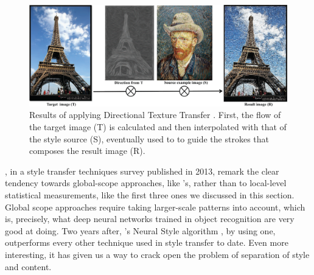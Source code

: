 \begin{figure}[htbp]
  \includegraphics[width=\textwidth]{gfx/style-transfer-directional}
  \caption{
    Results of applying Directional Texture Transfer \cite{Lee2010}.
    First, the flow of the target image (T) is calculated and then interpolated with that of the style source (S), eventually used to to guide the strokes that composes the result image (R).
  }
  \label{fig:sec:context:style-transfer:style-transfer-directional}
\end{figure}

\citeauthor{Kyprianidis2013}, in a style transfer techniques survey \cite{Kyprianidis2013} published in 2013, remark the clear tendency towards global-scope approaches, like \citeauthor{Lee2010}'s, rather than to local-level statistical measurements, like the first three ones we discussed in this section.
Global scope approaches require taking larger-scale patterns into account, which is, precisely, what deep neural networks trained in object recognition are very good at doing.
Two years after, \citeauthor{Gatys2015B}'s Neural Style algorithm \cite{Gatys2015B}, by using one, outperforms every other technique used in style transfer to date.
Even more interesting, it has given us a way to crack open the problem of separation of style and content.

